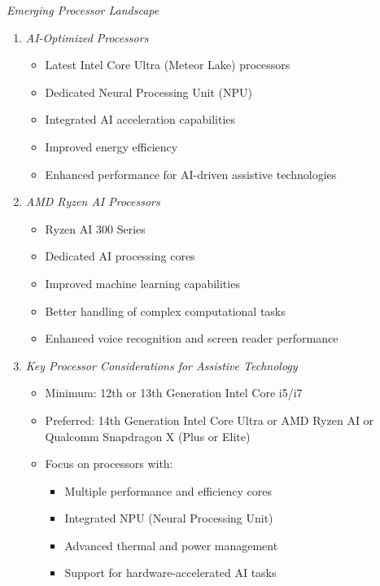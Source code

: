 \textit{Emerging Processor Landscape}
\begin{enumerate}
    \item \emph{AI-Optimized Processors}
        \begin{itemize}
            \item Latest Intel Core Ultra (Meteor Lake) processors
            \item Dedicated Neural Processing Unit (NPU)
            \item Integrated AI acceleration capabilities
            \item Improved energy efficiency
            \item Enhanced performance for AI-driven assistive technologies
        \end{itemize}
    \item \emph{AMD Ryzen AI Processors}
        \begin{itemize}
            \item Ryzen AI 300 Series
            \item Dedicated AI processing cores
            \item Improved machine learning capabilities
            \item Better handling of complex computational tasks
            \item Enhanced voice recognition and screen reader performance
        \end{itemize}
    \item \emph{Key Processor Considerations for Assistive Technology}
        \begin{itemize}
            \item Minimum: 12th or 13th Generation Intel Core i5/i7
            \item Preferred: 14th Generation Intel Core Ultra or AMD Ryzen AI or Qualcomm Snapdragon X (Plus or Elite)
            \item Focus on processors with:
                \begin{itemize}
                    \item Multiple performance and efficiency cores
                    \item Integrated NPU (Neural Processing Unit)
                    \item Advanced thermal and power management
                    \item Support for hardware-accelerated AI tasks
                \end{itemize}
        \end{itemize}
\end{enumerate}

